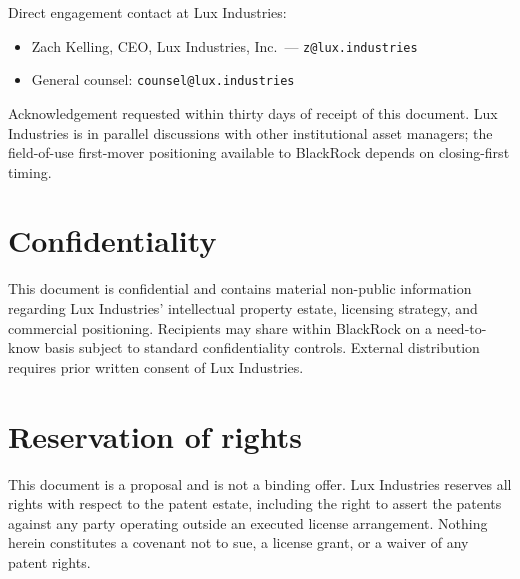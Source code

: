 \documentclass[11pt,letterpaper]{article}
\begin{document}
Direct engagement contact at Lux Industries:

\begin{itemize}
\item Zach Kelling, CEO, Lux Industries, Inc.\ --- \texttt{z@lux.industries}
\item General counsel: \texttt{counsel@lux.industries}
\end{itemize}

Acknowledgement requested within thirty days of receipt of this document. Lux Industries is in parallel discussions with other institutional asset managers; the field-of-use first-mover positioning available to BlackRock depends on closing-first timing.

\section*{Confidentiality}

This document is confidential and contains material non-public information regarding Lux Industries' intellectual property estate, licensing strategy, and commercial positioning. Recipients may share within BlackRock on a need-to-know basis subject to standard confidentiality controls. External distribution requires prior written consent of Lux Industries.

\section*{Reservation of rights}

This document is a proposal and is not a binding offer. Lux Industries reserves all rights with respect to the patent estate, including the right to assert the patents against any party operating outside an executed license arrangement. Nothing herein constitutes a covenant not to sue, a license grant, or a waiver of any patent rights.
\end{document}
